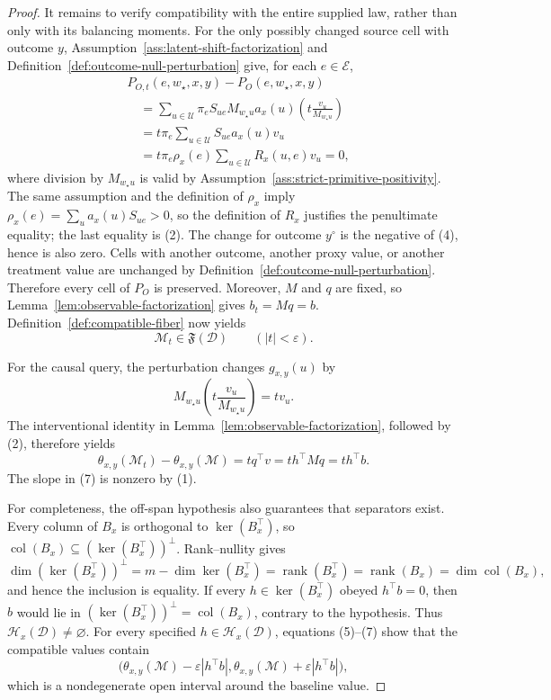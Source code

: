 \documentclass{article}
\begin{document}
\begin{proof}
It remains to verify compatibility with the entire supplied law, rather than only with its balancing moments. For the only possibly changed source cell with outcome \(y\), Assumption~\ref{ass:latent-shift-factorization} and Definition~\ref{def:outcome-null-perturbation} give, for each \(e\in\mathcal E\),
\[
\begin{aligned}
&P_{O,t}(e,w_{\star},x,y)-P_O(e,w_{\star},x,y)\\
&\quad=\sum_{u\in\mathcal U}\pi_eS_{ue}M_{w_{\star}u}a_x(u)
\left(t\frac{v_u}{M_{w_{\star}u}}\right)\\
&\quad=t\pi_e\sum_{u\in\mathcal U}S_{ue}a_x(u)v_u\\
&\quad=t\pi_e\rho_x(e)\sum_{u\in\mathcal U}R_x(u,e)v_u
=0,
\end{aligned}
\tag{4}
\]
where division by \(M_{w_{\star}u}\) is valid by Assumption~\ref{ass:strict-primitive-positivity}. The same assumption and the definition of \(\rho_x\) imply \(\rho_x(e)=\sum_u a_x(u)S_{ue}>0\), so the definition of \(R_x\) justifies the penultimate equality; the last equality is (2). The change for outcome \(y^{\circ}\) is the negative of (4), hence is also zero. Cells with another outcome, another proxy value, or another treatment value are unchanged by Definition~\ref{def:outcome-null-perturbation}. Therefore every cell of \(P_O\) is preserved. Moreover, \(M\) and \(q\) are fixed, so Lemma~\ref{lem:observable-factorization} gives \(b_t=Mq=b\). Definition~\ref{def:compatible-fiber} now yields
\[
\mathcal M_t\in\mathfrak F(\mathcal D)
\qquad (|t|<\varepsilon).
\tag{5}
\]

For the causal query, the perturbation changes \(g_{x,y}(u)\) by
\[
M_{w_{\star}u}\left(t\frac{v_u}{M_{w_{\star}u}}\right)=tv_u.
\tag{6}
\]
The interventional identity in Lemma~\ref{lem:observable-factorization}, followed by (2), therefore yields
\[
\theta_{x,y}(\mathcal M_t)-\theta_{x,y}(\mathcal M)
=tq^{\top}v
=t h^{\top}Mq
=t h^{\top}b.
\tag{7}
\]
The slope in (7) is nonzero by (1).

For completeness, the off-span hypothesis also guarantees that separators exist. Every column of \(B_x\) is orthogonal to \(\ker(B_x^{\top})\), so \(\operatorname{col}(B_x)\subseteq(\ker(B_x^{\top}))^{\perp}\). Rank--nullity gives
\[
\dim (\ker(B_x^{\top}))^{\perp}
=m-\dim\ker(B_x^{\top})
=\operatorname{rank}(B_x^{\top})
=\operatorname{rank}(B_x)
=\dim\operatorname{col}(B_x),
\]
and hence the inclusion is equality. If every \(h\in\ker(B_x^{\top})\) obeyed \(h^{\top}b=0\), then \(b\) would lie in \((\ker(B_x^{\top}))^{\perp}=\operatorname{col}(B_x)\), contrary to the hypothesis. Thus \(\mathcal H_x(\mathcal D)\ne\varnothing\). For every specified \(h\in\mathcal H_x(\mathcal D)\), equations (5)--(7) show that the compatible values contain
\[
\bigl(\theta_{x,y}(\mathcal M)-\varepsilon|h^{\top}b|,
      \theta_{x,y}(\mathcal M)+\varepsilon|h^{\top}b|\bigr),
\tag{8}
\]
which is a nondegenerate open interval around the baseline value.


\end{proof}
\end{document}
